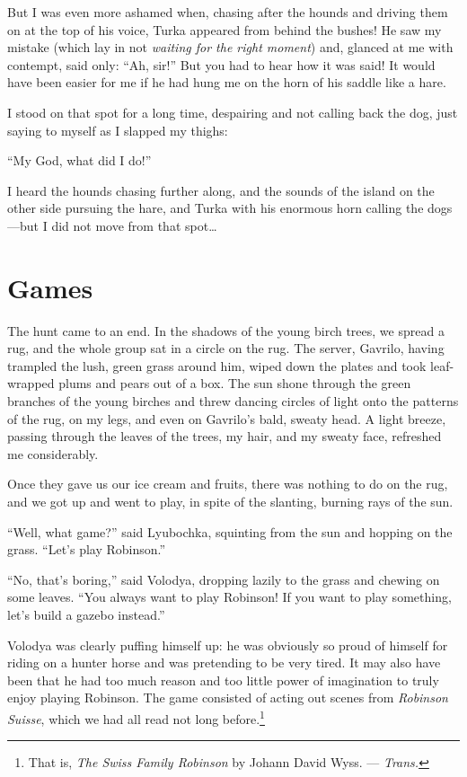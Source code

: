 But I was even more ashamed when, chasing after the hounds and driving them on at the top of his voice, Turka appeared from behind the bushes! He saw my mistake (which lay in not \emph{waiting for the right moment}) and, glanced at me with contempt, said only: ``Ah, sir!'' But you had to hear how it was said! It would have been easier for me if he had hung me on the horn of his saddle like a hare.

I stood on that spot for a long time, despairing and not calling back the dog, just saying to myself as I slapped my thighs:

``My God, what did I do!'' %

I heard the hounds chasing further along, and the sounds of the island on the other side pursuing the hare, and Turka with his enormous horn calling the dogs---but I did not move from that spot\ldots{}

\chapter{Games} %

The hunt came to an end. In the shadows of the young birch trees, we spread a rug, and the whole group sat in a circle on the rug. The server, Gavrilo, having trampled the lush, green grass around him, wiped down the plates and took leaf-wrapped plums and pears out of a box. The sun shone through the green branches of the young birches and threw dancing circles of light onto the patterns of the rug, on my legs, and even on Gavrilo's bald, sweaty head. A light breeze, passing through the leaves of the trees, my hair, and my sweaty face, refreshed me considerably.

Once they gave us our ice cream and fruits, there was nothing to do on the rug, and we got up and went to play, in spite of the slanting, burning rays of the sun.

``Well, what game?'' said Lyubochka, squinting from the sun and hopping on the grass. ``Let's play Robinson.'' %

``No, that's boring,'' said Volodya, dropping lazily to the grass and chewing on some leaves. ``You always want to play Robinson! If you want to play something, let's build a gazebo instead.'' %

Volodya was clearly puffing himself up: he was obviously so proud of himself for riding on a hunter horse and was pretending to be very tired. It may also have been that he had too much reason and too little power of imagination to truly enjoy playing Robinson. The game consisted of acting out scenes from \textit{Robinson Suisse}, which we had all read not long before.\footnote{That is, \textit{The Swiss Family Robinson} by Johann David Wyss. --- \textit{Trans.}}


